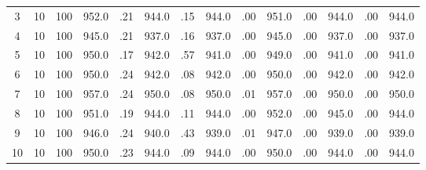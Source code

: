 \documentclass[12pt,a4paper]{article}
\begin{document}
\begin{center}
{\begin{tabular}{|ccc|cc|cc|cc|cc|cc|c|}
3             &  10& 100&    952.0&  .21&    944.0&  .15&    944.0&  .00&    951.0&  .00&    944.0&  .00&    944.0\\[-0.01in]
4             &  10& 100&    945.0&  .21&    937.0&  .16&    937.0&  .00&    945.0&  .00&    937.0&  .00&    937.0\\[-0.01in]
5             &  10& 100&    950.0&  .17&    942.0&  .57&    941.0&  .00&    949.0&  .00&    941.0&  .00&    941.0\\[-0.01in]
6             &  10& 100&    950.0&  .24&    942.0&  .08&    942.0&  .00&    950.0&  .00&    942.0&  .00&    942.0\\[-0.01in]
7             &  10& 100&    957.0&  .24&    950.0&  .08&    950.0&  .01&    957.0&  .00&    950.0&  .00&    950.0\\[-0.01in]
8             &  10& 100&    951.0&  .19&    944.0&  .11&    944.0&  .00&    952.0&  .00&    945.0&  .00&    944.0\\[-0.01in]
9             &  10& 100&    946.0&  .24&    940.0&  .43&    939.0&  .01&    947.0&  .00&    939.0&  .00&    939.0\\[-0.01in]
10            &  10& 100&    950.0&  .23&    944.0&  .09&    944.0&  .00&    950.0&  .00&    944.0&  .00&    944.0\\[-0.01in]
\hline
\end{tabular}
 }
\end{center}
\newpage
\end{document}
